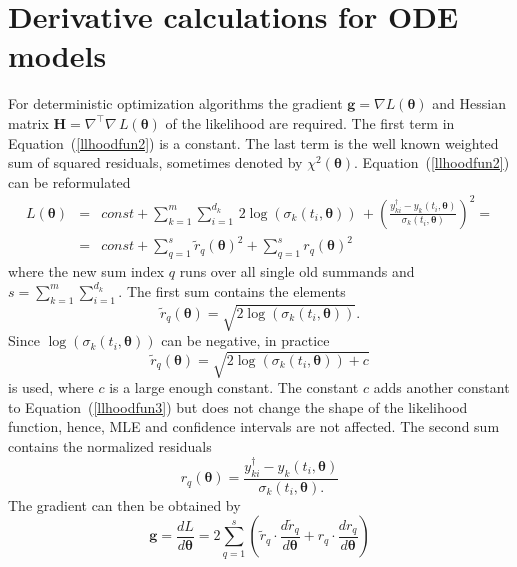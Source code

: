 \documentclass[12pt,a4paper]{scrartcl}
\newcommand{\DD}[2]{\frac{d #1}{d #2}}
\begin{document}
\section{Derivative calculations for ODE models} \label{sec:derivativies}
For deterministic optimization algorithms the gradient $\mathbf{g} = \nabla L(\boldsymbol{\theta})$ and Hessian matrix $\mathbf{H} = \nabla^\top\nabla\, L(\boldsymbol{\theta})$ of the likelihood are required. The first term in Equation~(\ref{llhoodfun2}) is a constant. The last term is the well known weighted sum of squared residuals, sometimes denoted by $\chi^2(\boldsymbol{\theta})$. Equation~(\ref{llhoodfun2}) can be reformulated
\begin{eqnarray}
	L(\boldsymbol{\theta}) & = & const + \sum_{k=1}^m \sum_{i=1}^{d_k}\, 2\log(\sigma_k(t_i, \boldsymbol{\theta}))\, +  \left(\frac{y_{ki}^\dagger - y_{k}(t_{i}, \boldsymbol{\theta})}{\sigma_k(t_i, \boldsymbol{\theta})}\right)^2 = \nonumber \\
	& = & const + \sum_{q=1}^{s} \tilde r_{q}(\boldsymbol{\theta})^2 + \sum_{q=1}^{s}  r_{q}(\boldsymbol{\theta})^2 \label{llhoodfun3}
\end{eqnarray}
where the new sum index $q$ runs over all single old summands and $s = \sum_{k=1}^m \sum_{i=1}^{d_k}$. The first sum contains the elements 
\begin{equation}
	\tilde r_{q}(\boldsymbol{\theta}) = \sqrt{2\log(\sigma_k(t_i, \boldsymbol{\theta}))}. \label{rl1}
\end{equation}	
Since $\log(\sigma_k(t_i, \boldsymbol{\theta}))$ can be negative, in practice 
\begin{equation}
	\tilde r_{q}(\boldsymbol{\theta}) = \sqrt{2\log(\sigma_k(t_i, \boldsymbol{\theta})) + c} \label{rl2}
\end{equation}
is used, where $c$ is a large enough constant. The constant $c$ adds another constant to Equation~(\ref{llhoodfun3}) but does not change the shape of the likelihood function, hence, MLE and confidence intervals are not affected. The second sum contains the normalized residuals 
\begin{equation}
	r_{q}(\boldsymbol{\theta}) = \frac{y_{ki}^\dagger - y_{k}(t_{i}, \boldsymbol{\theta})}{\sigma_k(t_i, \boldsymbol{\theta}).}  \label{rl3}
\end{equation}
The gradient can then be obtained by
\begin{equation}
	\mathbf{g} = \DD{L}{\boldsymbol{\theta}} = 2 \sum_{q=1}^{s} \left( {\tilde r}_{q} \cdot \DD{{\tilde r}_{q}}{\boldsymbol{\theta}} + {r}_{q} \cdot \DD{{r}_{q}}{\boldsymbol{\theta}} \right)
\end{equation}
\end{document}
